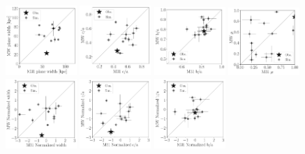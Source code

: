 \documentclass[a4paper,fleqn,usenatbib]{mnras}
\begin{document}
\begin{figure}
\centering
\includegraphics[width=0.24\textwidth]{scatter_ranked_elvis_width.pdf}
\includegraphics[width=0.24\textwidth]{scatter_ranked_elvis_ca_ratio.pdf}
\includegraphics[width=0.24\textwidth]{scatter_ranked_elvis_ba_ratio.pdf}
\includegraphics[width=0.24\textwidth]{scatter_ranked_elvis_mu.pdf}
\includegraphics[width=0.24\textwidth]{scatter_norm_ranked_elvis_width.pdf}
\includegraphics[width=0.24\textwidth]{scatter_norm_ranked_elvis_ca_ratio.pdf}
\includegraphics[width=0.24\textwidth]{scatter_norm_ranked_elvis_ba_ratio.pdf}

\end{figure}
\end{document}
